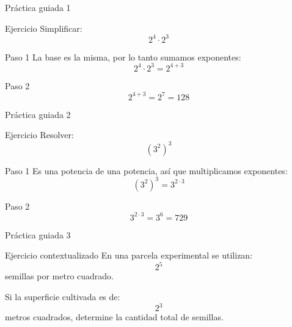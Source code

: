 \documentclass[aspectratio=169,10pt,handout]{beamer}
\newcommand{\pp}{\pause}
\begin{document}
	\begin{frame}{Práctica guiada 1}
		\begin{block}{Ejercicio}
			Simplificar:
			\[
			2^4\cdot2^3
			\]
		\end{block}
		
		\pp
		
		\begin{exampleblock}{Paso 1}
			La base es la misma, por lo tanto sumamos exponentes:
			\[
			2^4\cdot2^3 = 2^{4+3}
			\]
		\end{exampleblock}
		
		\pp
		
		\begin{exampleblock}{Paso 2}
			\[
			2^{4+3}=2^7=128
			\]
		\end{exampleblock}
	\end{frame}
	
	\begin{frame}{Práctica guiada 2}
		\begin{block}{Ejercicio}
			Resolver:
			\[
			(3^2)^3
			\]
		\end{block}
		
		\pp
		
		\begin{exampleblock}{Paso 1}
			Es una potencia de una potencia, así que multiplicamos exponentes:
			\[
			(3^2)^3=3^{2\cdot3}
			\]
		\end{exampleblock}
		
		\pp
		
		\begin{exampleblock}{Paso 2}
			\[
			3^{2\cdot3}=3^6=729
			\]
		\end{exampleblock}
	\end{frame}
	
	\begin{frame}{Práctica guiada 3}
		\begin{block}{Ejercicio contextualizado}
			En una parcela experimental se utilizan:
			\[
			2^5
			\]
			semillas por metro cuadrado.
			
			Si la superficie cultivada es de:
			\[
			2^3
			\]
			metros cuadrados, determine la cantidad total de semillas.
		\end{block}
	\end{frame}
	
\end{document}

